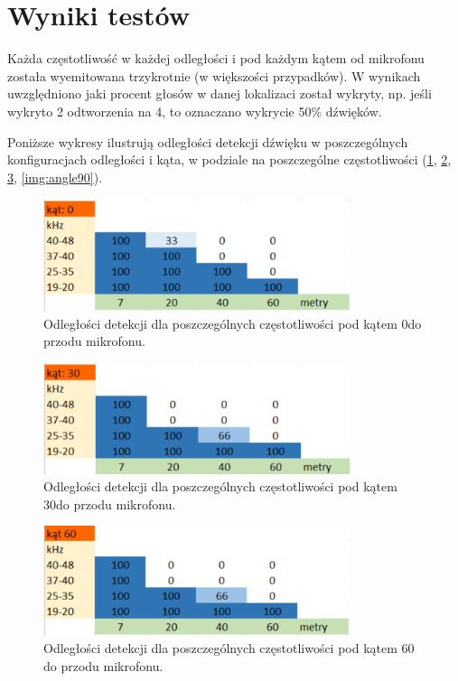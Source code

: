 \documentclass{sprz}
\begin{document}
\section{Wyniki testów}
Każda częstotliwość w każdej odległości i pod każdym kątem od mikrofonu została wyemitowana trzykrotnie (w większości przypadków). W wynikach uwzględniono jaki procent głosów w danej lokalizaci został wykryty, np. jeśli wykryto 2 odtworzenia na 4, to oznaczano wykrycie 50\% dźwięków.

Poniższe wykresy ilustrują odległości detekcji dźwięku w poszczególnych konfiguracjach odległości i kąta, w podziale na poszczególne częstotliwości (\ref{img:angle0}, \ref{img:angle30}, \ref{img:angle60}, \ref{img:angle90}).

  \begin{figure}[h]
    \centering
    \includegraphics[width=0.8\textwidth]{sprz/angle0.png}
    \caption{Odległości detekcji dla poszczególnych częstotliwości pod kątem 0\textdegree do przodu mikrofonu.}
    \label{img:angle0}
  \end{figure}
\clearpage

  \begin{figure}[h]
    \centering
    \includegraphics[width=0.8\textwidth]{sprz/angle30.png}
    \caption{Odległości detekcji dla poszczególnych częstotliwości pod kątem 30\textdegree do przodu mikrofonu.}
    \label{img:angle30}
  \end{figure} 

  \begin{figure}[h]
    \centering
    \includegraphics[width=0.8\textwidth]{sprz/angle60.png}
    \caption{Odległości detekcji dla poszczególnych częstotliwości pod kątem 60 do przodu mikrofonu.}
    \label{img:angle60}
  \end{figure} 
\end{document}

